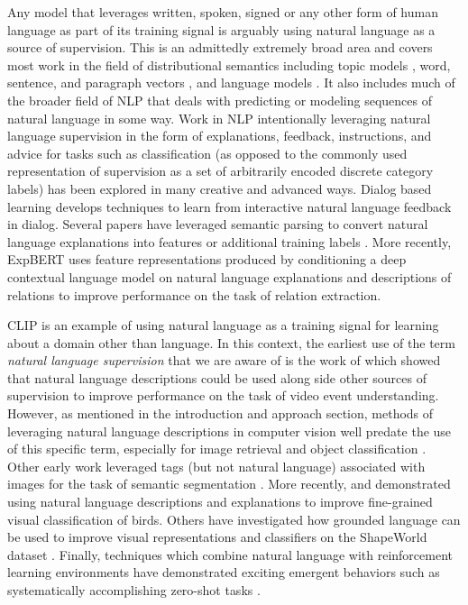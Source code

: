 \documentclass{article}
\begin{document}
Any model that leverages written, spoken, signed or any other form of human language as part of its training signal is arguably using natural language as a source of supervision. This is an admittedly extremely broad area and covers most work in the field of distributional semantics including topic models \citep{blei2003latent}, word, sentence, and paragraph vectors \citep{mikolov2013distributed,kiros2015skip,le2014distributed}, and language models \citep{bengio2003neural}. It also includes much of the broader field of NLP that deals with predicting or modeling sequences of natural language in some way. Work in NLP intentionally leveraging natural language supervision in the form of explanations, feedback, instructions, and advice for tasks such as classification (as opposed to the commonly used representation of supervision as a set of arbitrarily encoded discrete category labels) has been explored in many creative and advanced ways. Dialog based learning \citep{weston2016dialog,li2016learning,hancock2019learning} develops techniques to learn from interactive natural language feedback in dialog. Several papers have leveraged semantic parsing to convert natural language explanations into features \citep{srivastava2017joint} or additional training labels \citep{hancock2018training}. More recently, ExpBERT \citep{murty2020expbert} uses feature representations produced by conditioning a deep contextual language model on natural language explanations and descriptions of relations to improve performance on the task of relation extraction.

CLIP is an example of using natural language as a training signal for learning about a domain other than language. In this context, the earliest use of the term \textit{natural language supervision} that we are aware of is the work of \citet{ramanathan2013video} which showed that natural language descriptions could be used along side other sources of supervision to improve performance on the task of video event understanding. However, as mentioned in the introduction and approach section, methods of leveraging natural language descriptions in computer vision well predate the use of this specific term, especially for image retrieval \citep{mori1999image} and object classification \citep{wang2009learning}. Other early work leveraged tags (but not natural language) associated with images for the task of semantic segmentation \citep{barnard2003matching}. More recently, \citet{he2017fine} and \citet{liang2020alice} demonstrated using natural language descriptions and explanations to improve fine-grained visual classification of birds. Others have investigated how grounded language can be used to improve visual representations and classifiers on the ShapeWorld dataset \citep{kuhnle2017shapeworld,andreas2017learning,mu2019shaping}. Finally, techniques which combine natural language with reinforcement learning environments \citep{narasimhan2015language} have demonstrated exciting emergent behaviors such as systematically accomplishing zero-shot tasks \citep{hill2019environmental}.
\end{document}
